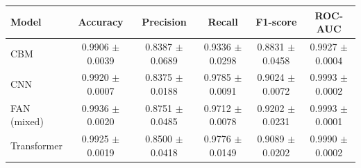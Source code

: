 \begin{tabular}{lccccc}
\toprule
Model & Accuracy & Precision & Recall & F1-score & ROC-AUC \\
\midrule
CBM & 0.9906 $\pm$ 0.0039 & 0.8387 $\pm$ 0.0689 & 0.9336 $\pm$ 0.0298 & 0.8831 $\pm$ 0.0458 & 0.9927 $\pm$ 0.0004 \\
CNN & 0.9920 $\pm$ 0.0007 & 0.8375 $\pm$ 0.0188 & 0.9785 $\pm$ 0.0091 & 0.9024 $\pm$ 0.0072 & 0.9993 $\pm$ 0.0002 \\
FAN (mixed) & 0.9936 $\pm$ 0.0020 & 0.8751 $\pm$ 0.0485 & 0.9712 $\pm$ 0.0078 & 0.9202 $\pm$ 0.0231 & 0.9993 $\pm$ 0.0001 \\
Transformer & 0.9925 $\pm$ 0.0019 & 0.8500 $\pm$ 0.0418 & 0.9776 $\pm$ 0.0149 & 0.9089 $\pm$ 0.0202 & 0.9990 $\pm$ 0.0002 \\
\bottomrule
\end{tabular}
